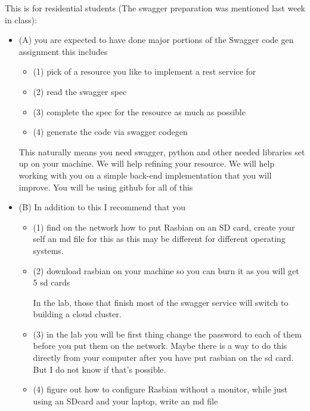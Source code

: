\begin{exercise}
  This is for residential students (The swagger preparation was
  mentioned last week in class):

 \begin{itemize}

 \item (A) you are expected to have done major portions of the Swagger
   code gen assignment this includes

  \begin{itemize}
  \item (1) pick of a resource you like to implement a rest service
    for
  \item (2) read the swagger spec
  \item (3) complete the spec for the resource as much as possible
  \item (4) generate the code via swagger codegen
  \end{itemize}

  This naturally means you need swagger, python and other needed
  libraries set up on your machine. We will help refining your
  resource. We will help working with you on a simple back-end
  implementation that you will improve. You will be using github for
  all of this

\item (B) In addition to this I recommend that you

  \begin{itemize}

  \item (1) find on the network how to put Rasbian on an SD card,
    create your self an md file for this as this may be different for
    different operating systems.

 
  \item (2) download rasbian on your machine so you can burn it as you
    will get 5 sd cards
 
    In the lab, those that finish most of the swagger service will
    switch to building a cloud cluster.
 
  \item (3) in the lab you will be first thing change the password to
    each of them before you put them on the network. Maybe there is a
    way to do this directly from your computer after you have put
    rasbian on the sd card. But I do not know if that's possible.

 
  \item (4) figure out how to configure Rasbian without a monitor,
    while just using an SDcard and your laptop, write an md file


\end{itemize}
\end{itemize}
\end{exercise}
